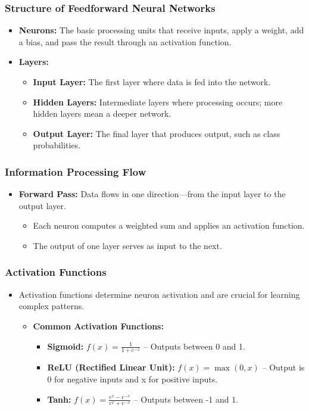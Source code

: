 \documentclass[aspectratio=169]{beamer}
\begin{document}
\begin{frame}[fragile]
    \frametitle{Structure of Feedforward Neural Networks}
    \begin{itemize}
        \item \textbf{Neurons:} The basic processing units that receive inputs, apply a weight, add a bias, and pass the result through an activation function.
        
        \item \textbf{Layers:}
        \begin{itemize}
            \item \textbf{Input Layer:} The first layer where data is fed into the network.
            \item \textbf{Hidden Layers:} Intermediate layers where processing occurs; more hidden layers mean a deeper network.
            \item \textbf{Output Layer:} The final layer that produces output, such as class probabilities.
        \end{itemize}
    \end{itemize}
\end{frame}

\begin{frame}[fragile]
    \frametitle{Information Processing Flow}
    \begin{itemize}
        \item \textbf{Forward Pass:} Data flows in one direction—from the input layer to the output layer.
        \begin{itemize}
            \item Each neuron computes a weighted sum and applies an activation function.
            \item The output of one layer serves as input to the next.
        \end{itemize}
    \end{itemize}
\end{frame}

\begin{frame}[fragile]
    \frametitle{Activation Functions}
    \begin{itemize}
        \item Activation functions determine neuron activation and are crucial for learning complex patterns.
        \begin{itemize}
            \item \textbf{Common Activation Functions:}
            \begin{itemize}
                \item \textbf{Sigmoid:} \( f(x) = \frac{1}{1 + e^{-x}} \) – Outputs between 0 and 1.
                \item \textbf{ReLU (Rectified Linear Unit):} \( f(x) = \max(0, x) \) – Output is 0 for negative inputs and x for positive inputs.
                \item \textbf{Tanh:} \( f(x) = \frac{e^{x} - e^{-x}}{e^{x} + e^{-x}} \) – Outputs between -1 and 1.
            \end{itemize}
        \end{itemize}
    \end{itemize}
\end{frame}
\end{document}
